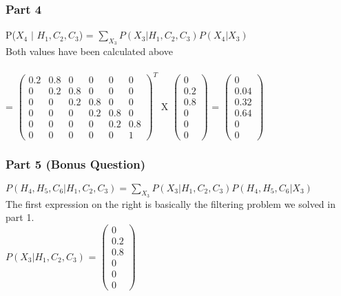 \documentclass{article}
\begin{document}
\subsubsection*{Part 4}
P($X_4$ $\vert$ $H_1, C_2, C_3$) = $\sum_{X_3} P(X_3 \vert H_1, C_2, C_3)P(X_4 \vert X_3)$\\
Both values have been calculated above \\
\\
\indent 
= $\left(\begin{array}{cccccc} 
        0.2 & 0.8 & 0 & 0 & 0 & 0 \\ 
        0 & 0.2 & 0.8 & 0 & 0 & 0 \\ 
        0 & 0 & 0.2 & 0.8 & 0 & 0 \\ 
        0 & 0 & 0 & 0.2 & 0.8 & 0 \\ 
        0 & 0 & 0 & 0 & 0.2 & 0.8 \\ 
        0 & 0 & 0 & 0 & 0 & 1
    \end{array}\right)^T$ X 
$\left(\begin{array}{c} 
        0 \\
        0.2 \\ 
        0.8 \\
        0 \\
        0 \\
        0
    \end{array}\right)$ 
= $\left(\begin{array}{c} 
        0 \\
        0.04 \\ 
        0.32 \\
        0.64 \\
        0 \\
        0
    \end{array}\right)$ \\ 

    
\subsubsection*{Part 5 (Bonus Question)}
$P(H_4, H_5, C_6 \vert H_1, C_2, C_3) = \sum_{X_3}P(X_3 \vert H_1, C_2, C_3) P(H_4, H_5, C_6 \vert X_3)$ \\

\noindent
The first expression on the right is basically the filtering problem we solved in part 1. \\ 
\noindent 
$P(X_3 \vert H_1, C_2, C_3)$ = 
$\left(\begin{array}{c} 
        0 \\
        0.2 \\ 
        0.8 \\
        0 \\
        0 \\
        0
    \end{array}\right)$ \\ 
\end{document}
